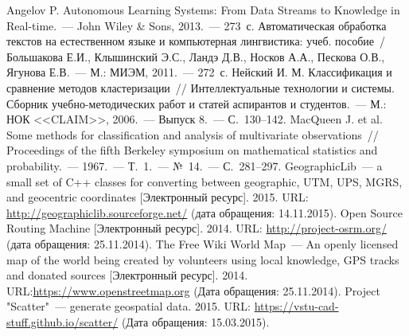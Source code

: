 \begin{thebibliography}{99}
     Angelov P. Autonomous Learning Systems: From Data Streams to Knowledge in Real-time.~--- John Wiley \& Sons, 2013.~--- 273~с.
     Автоматическая обработка текстов на естественном языке и компьютерная лингвистика: учеб. пособие~/ Большакова Е.И., Клышинский Э.С., Ландэ Д.В.,
Носков А.А., Пескова О.В., Ягунова Е.В.~--- М.: МИЭМ, 2011.~--- 272~с.
     Нейский И. М. Классификация и сравнение методов кластеризации~// Интеллектуальные технологии и системы. Сборник учебно-методических работ и статей аспирантов и студентов.~--- М.: НОК <<CLAIM>>, 2006.~--- Выпуск 8.~--- С.~130--142.
     MacQueen J. et al. Some methods for classification and analysis of multivariate observations~// Proceedings of the fifth Berkeley symposium on mathematical statistics and probability.~--- 1967.~--- Т.~1.~--- №~14.~--- С.~281--297.
     GeographicLib~--- a small set of C++ classes for converting between geographic, UTM, UPS, MGRS, and geocentric coordinates [Электронный ресурс]. 2015. URL: \url{http://geographiclib.sourceforge.net/} (дата обращения: 14.11.2015).
     Open Source Routing Machine [Электронный ресурс]. 2014. URL: \url{http://project-osrm.org/} (дата обращения: 25.11.2014).
     The Free Wiki World Map~--- An openly licensed map of the world being created by volunteers using local knowledge, GPS tracks and donated sources [Электронный ресурс]. 2014. URL:\url{https://www.openstreetmap.org} (Дата обращения: 25.11.2014).
     Project "Scatter"~--- generate geospatial data. 2015. URL: \url{https://vstu-cad-stuff.github.io/scatter/} (Дата обращения: 15.03.2015).
        

\end{thebibliography}
